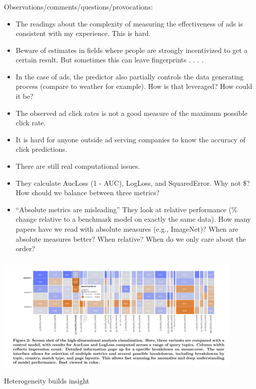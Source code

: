 \documentclass[aspectratio=169]{beamer}
\begin{document}
\begin{frame}
\frametitle{}

Observations/comments/questions/provocations:
\begin{itemize}
\item The readings about the complexity of measuring the effectiveness of ads is consistent with my experience.  This is hard.
\item Beware of estimates in fields where people are strongly incentivized to get a certain result. But sometimes this can leave fingerprints . . . . 
\item In the case of ads, the predictor also partially controls the data generating process (compare to weather for example). How is that leveraged? How could it be?
\pause
\item The observed ad click rates is not a good measure of the maximum possible click rate.
\pause
\item It is hard for anyone outside ad serving companies to know the accuracy of click predictions.
\pause
\item There are still real computational issues.
\pause
\item They calculate AucLoss (1 - AUC), LogLoss, and SquaredError. Why not \$? How should we balance between three metrics?
\pause
\item ``Absolute metrics are misleading'' They look at relative performance (\% change relative to a benchmark model on exactly the same data). How many papers have we read with absolute measures (e.g., ImageNet)? When are absolute measures better? When relative? When do we only care about the order?
\end{itemize}

\end{frame}
\begin{frame}
\frametitle{}

\begin{center}
\includegraphics[width=0.9\textwidth]{figures/mcmahan_ad_2013_fig2}
\end{center}

\vfill
Heterogeneity builds insight
\end{frame}




\frame{\titlepage}
\end{document}
